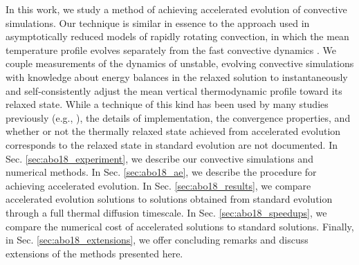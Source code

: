 In this work, we study a method of achieving accelerated evolution of convective simulations. 
Our technique is similar in essence to the approach used in asymptotically reduced models of rapidly rotating convection, in which the mean temperature profile evolves separately from the fast convective dynamics \citep{julien&all1998, sprague&all2006}. 
We couple measurements of the dynamics of unstable, evolving convective simulations with knowledge about energy balances in the relaxed solution to instantaneously and self-consistently adjust the mean vertical thermodynamic profile toward its relaxed state. 
While a technique of this kind has been used by many studies previously (e.g., \citep{hurlburt&all1986}), the details of implementation, the convergence properties, and whether or not the thermally relaxed state achieved from accelerated evolution corresponds to the relaxed state in standard evolution are not documented.
In Sec. \ref{sec:abo18_experiment}, we describe our convective simulations and numerical methods. 
In Sec. \ref{sec:abo18_ae}, we describe the procedure for achieving accelerated evolution. 
In Sec. \ref{sec:abo18_results}, we compare accelerated evolution solutions to solutions obtained from standard evolution through a full thermal diffusion timescale. 
In Sec. \ref{sec:abo18_speedups}, we compare the numerical cost of accelerated solutions to standard solutions.
Finally, in Sec. \ref{sec:abo18_extensions}, we offer concluding remarks and discuss extensions of the methods presented here.




